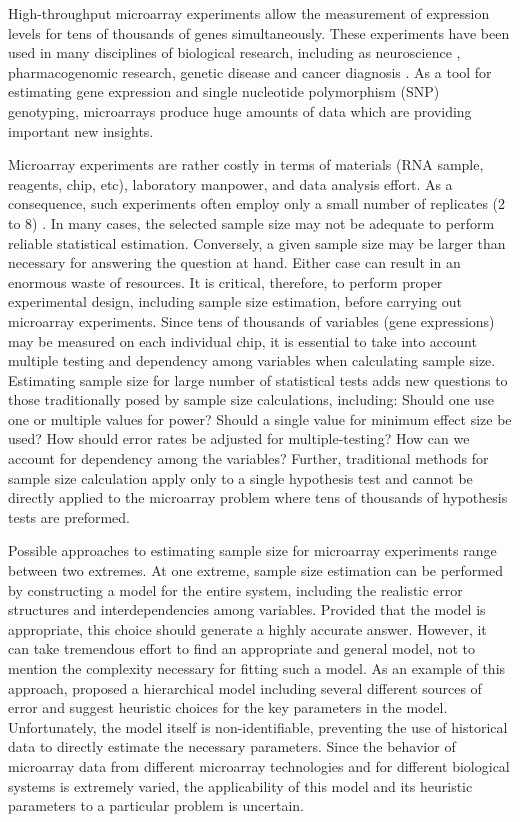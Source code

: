 \documentclass[12pt]{article}
\begin{document}
High-throughput microarray experiments allow the measurement of
expression levels for tens of thousands of genes simultaneously.
These experiments have been used in many disciplines of biological
research, including as neuroscience \citep{Mandel03},
pharmacogenomic research, genetic disease and cancer diagnosis
\citep{Heller02}.  As a tool for estimating gene expression and
single nucleotide polymorphism (SNP) genotyping, microarrays produce
huge amounts of data which are providing important new insights.

Microarray experiments are rather costly in terms of materials (RNA
sample, reagents, chip, etc), laboratory manpower, and data analysis
effort.  As a consequence, such experiments often employ only a
small number of replicates (2 to 8) \citep{Speed03}. In many cases,
the selected sample size may not be adequate to perform reliable
statistical estimation.  Conversely, a given sample size may be
larger than necessary for answering the question at hand.  Either
case can result in an enormous waste of resources. It is critical,
therefore, to perform proper experimental design, including sample
size estimation, before carrying out microarray experiments. Since
tens of thousands of variables (gene expressions) may be measured on
each individual chip, it is essential to take into account multiple
testing and dependency among variables when calculating sample size.
Estimating sample size for large number of statistical tests adds
new questions to those traditionally posed by sample size
calculations, including: Should one use one or multiple values for
power? Should a single value for minimum effect size be used?  How
should error rates be adjusted for multiple-testing?  How can we
account for dependency among the variables?  Further, traditional
methods for sample size calculation apply only to a single
hypothesis test and cannot be directly applied to the microarray
problem where tens of thousands of hypothesis tests are preformed.

Possible approaches to estimating sample size for microarray
experiments range between two extremes. At one extreme, sample size
estimation can be performed by constructing a model for the entire
system, including the realistic error structures and
interdependencies among variables. Provided that the model is
appropriate, this choice should generate a highly accurate answer.
However, it can take tremendous effort to find an appropriate and
general model, not to mention the complexity necessary for fitting
such a model. As an example of this approach, \citet{Zien03}
proposed a hierarchical model including several different sources of
error and suggest heuristic choices for the key parameters in the
model. Unfortunately, the model itself is non-identifiable,
preventing the use of historical data to directly estimate the
necessary parameters.  Since the behavior of microarray data from
different microarray technologies and for different biological
systems is extremely varied, the applicability of this model and its
heuristic parameters to a particular problem is uncertain.
\end{document}
